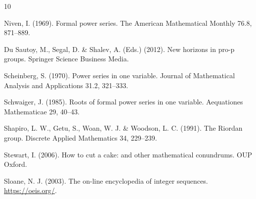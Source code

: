 \documentclass[preprint,12pt]{elsarticle}
\begin{document}
\begin{thebibliography}{10}

 Niven, I. (1969). Formal power series. The American Mathematical Monthly 76.8, 871--889.


 {Du Sautoy, M., Segal, D. \&  Shalev, A. (Eds.) (2012). New horizons in pro-p groups. Springer Science  Business Media.}


 Scheinberg, S. (1970). Power series in one variable. Journal of Mathematical Analysis and Applications 31.2, 321--333.


 Schwaiger, J. (1985). Roots of formal power series in one variable. Aequationes Mathematicae 29, 40--43.

 Shapiro, L. W.,  Getu, S., Woan, W. J. \&   Woodson, L. C. (1991). The Riordan group. Discrete Applied Mathematics 34, 229--239.


 Stewart, I. (2006). How to cut a cake: and other mathematical conundrums. OUP Oxford.


 Sloane, N. J. (2003). The on-line encyclopedia of integer sequences. \url{https://oeis.org/}.

\end{thebibliography}
\end{document}

